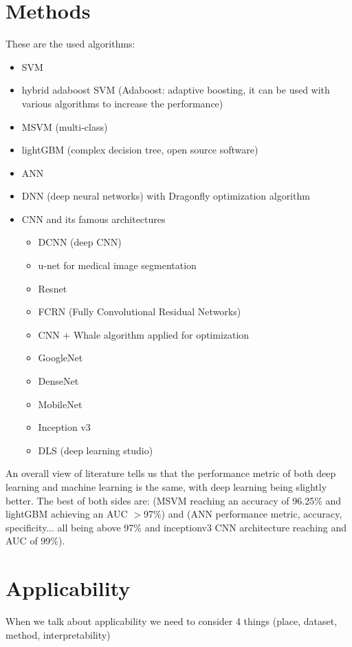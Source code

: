 \section{Methods}
    These are the used algorithms:
    \begin{itemize}
        \item SVM 
        \item hybrid adaboost SVM (Adaboost: adaptive boosting, it can be used with various algorithms to increase the performance)
        \item MSVM (multi-class) 
        \item lightGBM (complex decision tree, open source software) 
        \item ANN
        \item DNN (deep neural networks) with Dragonfly optimization algorithm 
        \item CNN and its famous architectures 
        \begin{itemize}
            \item DCNN (deep CNN) 
            \item u-net for medical image segmentation
            \item Resnet 
            \item FCRN (Fully Convolutional Residual Networks) 
            \item CNN + Whale algorithm applied for optimization
            \item GoogleNet 
            \item DenseNet 
            \item MobileNet 
            \item Inception v3
            \item DLS (deep learning studio) 
        \end{itemize}
    \end{itemize}
    An overall view of literature tells us that the performance metric of both deep learning and machine learning is the same, with deep learning being slightly better. The best of both sides are: (MSVM reaching an accuracy of 96.25\% and lightGBM achieving an AUC $>$97\%) and (ANN performance metric, accuracy, specificity... all being above 97\% and inceptionv3 CNN architecture reaching and AUC of 99\%).


    
\section{Applicability}
    When we talk about applicability we need to consider 4 things (place, dataset, method, interpretability)
    
